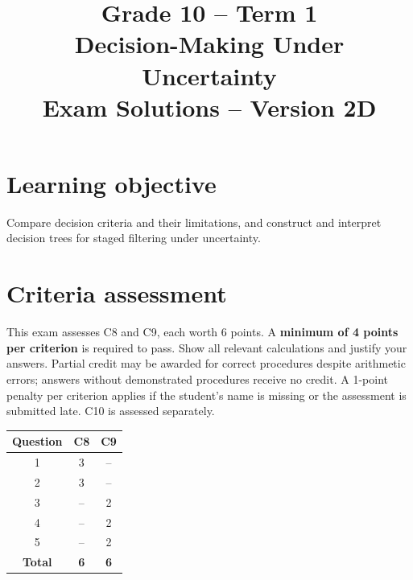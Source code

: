 \makeatletter
{}
\makeatother

\title{Grade 10 -- Term 1\\Decision-Making Under Uncertainty\\Exam Solutions -- Version 2D}
\author{}\date{}

\maketitle
\setcounter{tocdepth}{1}\setcounter{secnumdepth}{2}
\label{toc}\tableofcontents
\section*{Learning objective}
Compare decision criteria and their limitations, and construct and interpret decision trees for staged filtering under uncertainty.
\section*{Criteria assessment}
This exam assesses C8 and C9, each worth 6 points. A \textbf{minimum of 4 points per criterion} is required to pass. Show all relevant calculations and justify your answers. Partial credit may be awarded for correct procedures despite arithmetic errors; answers without demonstrated procedures receive no credit. A 1-point penalty per criterion applies if the student's name is missing or the assessment is submitted late. C10 is assessed separately.
\begin{center}
\begin{tabular}{|c|c|c|}
				\hline
				\textbf{Question} & \textbf{C8} & \textbf{C9} \\ \hline
				1 & 3 & -- \\ \hline
				2 & 3 & -- \\ \hline
				3 & -- & 2 \\ \hline
				4 & -- & 2 \\ \hline
				5 & -- & 2 \\ \hline
				\textbf{Total} & \textbf{6} & \textbf{6} \\ \hline
			\end{tabular}
\end{center}
